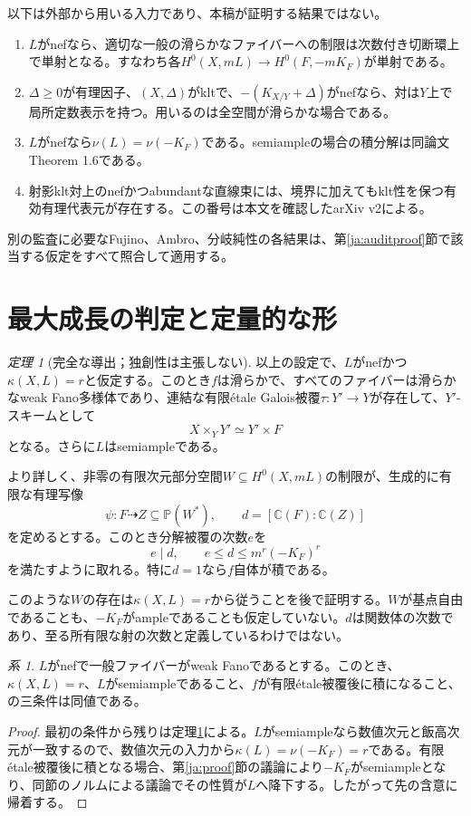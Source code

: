 \documentclass[12pt]{amsart}
\theoremstyle{definition}
\theoremstyle{remark}
\numberwithin{equation}{section}
\newcommand{\C}{\mathbb{C}}
\newcommand{\mP}{\mathbb{P}}
\newtheorem{jthm}[thm]{定理}
\newtheorem{jcor}[thm]{系}
\begin{document}
以下は外部から用いる入力であり、本稿が証明する結果ではない。
\begin{enumerate}
\item $L$がnefなら、適切な一般の滑らかなファイバーへの制限は次数付き切断環上で単射となる。すなわち各$H^0(X,mL)\to H^0(F,-mK_F)$が単射である\cite[Theorem 1.2]{ja:EG}。
\item $\Delta\geq0$が有理因子、$(X,\Delta)$がkltで、$-(K_{X/Y}+\Delta)$がnefなら、対は$Y$上で局所定数表示を持つ\cite[Theorem 4.6]{ja:EIM}。用いるのは全空間が滑らかな場合である。
\item $L$がnefなら$\nu(L)=\nu(-K_F)$である\cite[Theorem 1.5]{ja:EIM}。semiampleの場合の積分解は同論文Theorem 1.6である。
\item 射影klt対上のnefかつabundantな直線束には、境界に加えてもklt性を保つ有効有理代表元が存在する\cite[Corollary 5.3, Lemma 5.4]{ja:CDB}。この番号は本文を確認したarXiv v2による。
\end{enumerate}
別の監査に必要なFujino、Ambro、分岐純性の各結果は、第\ref{ja:auditproof}節で該当する仮定をすべて照合して適用する。

\section{最大成長の判定と定量的な形}\label{ja:main}
\begin{jthm}[完全な導出；独創性は主張しない]\label{ja:criterion}
以上の設定で、$L$がnefかつ$\kappa(X,L)=r$と仮定する。このとき$f$は滑らかで、すべてのファイバーは滑らかなweak Fano多様体であり、連結な有限étale Galois被覆$\tau:Y'\to Y$が存在して、$Y'$-スキームとして
\[
 X\times_Y Y'\simeq Y'\times F
\]
となる。さらに$L$はsemiampleである。

より詳しく、非零の有限次元部分空間$W\subseteq H^0(X,mL)$の制限が、生成的に有限な有理写像
\[
 \psi:F\dashrightarrow Z\subseteq\mP(W^*),\qquad
 d=[\C(F):\C(Z)]
\]
を定めるとする。このとき分解被覆の次数$e$を
\begin{equation}\label{ja:degree}
 e\mid d,\qquad e\leq d\leq m^r(-K_F)^r
\end{equation}
を満たすように取れる。特に$d=1$なら$f$自体が積である。
\end{jthm}

このような$W$の存在は$\kappa(X,L)=r$から従うことを後で証明する。$W$が基点自由であることも、$-K_F$がampleであることも仮定していない。$d$は関数体の次数であり、至る所有限な射の次数と定義しているわけではない。

\begin{jcor}\label{ja:equiv}
$L$がnefで一般ファイバーがweak Fanoであるとする。このとき、$\kappa(X,L)=r$、$L$がsemiampleであること、$f$が有限étale被覆後に積になること、の三条件は同値である。
\end{jcor}
\begin{proof}
最初の条件から残りは定理\ref{ja:criterion}による。$L$がsemiampleなら数値次元と飯高次元が一致するので、数値次元の入力から$\kappa(L)=\nu(-K_F)=r$である。有限étale被覆後に積となる場合、第\ref{ja:proof}節の議論により$-K_F$がsemiampleとなり、同節のノルムによる議論でその性質が$L$へ降下する。したがって先の含意に帰着する。
\end{proof}
\end{document}
